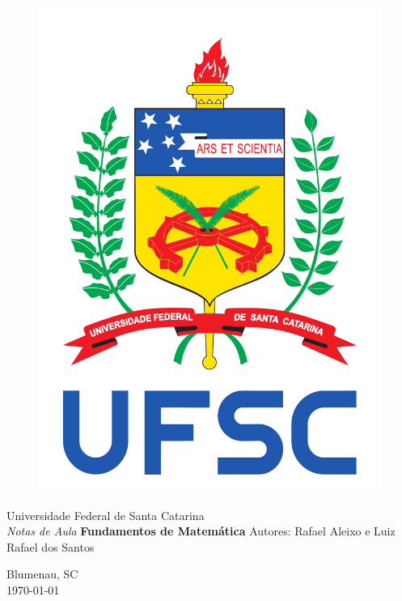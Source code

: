\thispagestyle{empty}
\begin{figure}[!h]
\centering
\begin{minipage}{0.12\linewidth}
\vspace{-1cm} \includegraphics[width=\textwidth]{brasao_ufsc_color}
\end{minipage}\hspace{.5cm}
\end{figure}
\begin{center}
{\Huge Universidade Federal de Santa Catarina} \\ \vfill
\vfill
{\Large \it Notas de Aula}
\vfill
\vfill
{\LARGE \textbf{Fundamentos de Matem\'atica}}
\vfill
\vfill
{\Large Autores: Rafael Aleixo e Luiz Rafael dos Santos}
\vfill
\vfill
\end{center}
\begin{center}
\vfill
{\large Blumenau, SC}\\
{\large \today}
\vfill
\end{center}

